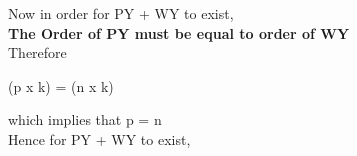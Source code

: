 \documentclass{article}
\begin{document}
\vspace{0.2cm}
Now in order for PY + WY to exist,\\
\vspace{0.2cm}
\textbf{The Order of PY must be equal to order of WY}\\
\vspace{0.2cm}
Therefore \\
\vspace{0.2cm}
\begin{center}
(p x k) = (n x k)\\
\end{center}
\vspace{0.2cm}
which implies that p = n\\
\vspace{0.2cm}
Hence for PY + WY to exist,\\ \\
  
\end{document}
